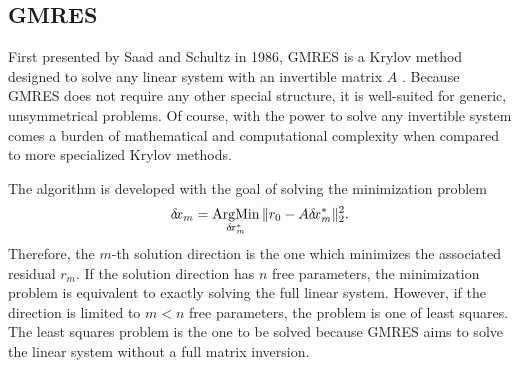 \documentclass[12pt]{UWMadThesis}
\begin{document}
\subsection{GMRES}
First presented by Saad and Schultz in 1986, GMRES is a Krylov method designed to solve any linear system with an invertible matrix $A$ \cite{saad_gmres_1986}.
Because GMRES does not require any other special structure, it is well-suited for generic, unsymmetrical problems.
Of course, with the power to solve any invertible system comes a burden of mathematical and computational complexity when compared to more specialized Krylov methods.

The algorithm is developed with the goal of solving the minimization problem
\begin{equation}
    \delta \mkern-3.00mu x_m = \operatorname*{ArgMin}_{\delta \mkern-3.00mu x_m^*} \|r_0 - A \delta \mkern-3.00mu x_m^*\|_2^2.
    \label{Eqn:GMRESMinimization}
\end{equation}
Therefore, the $m$-th solution direction is the one which minimizes the associated residual $r_m$.
If the solution direction has $n$ free parameters, the minimization problem is equivalent to exactly solving the full linear system.
However, if the direction is limited to $m < n$ free parameters, the problem is one of least squares.
The least squares problem is the one to be solved because GMRES aims to solve the linear system without a full matrix inversion.
\end{document}

